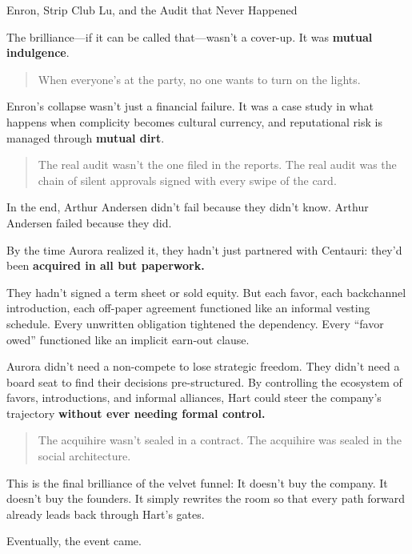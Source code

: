 \begin{HistoricalSidebar}{Enron, Strip Club Lu, and the Audit that Never Happened}
  \medskip
  
  The brilliance—if it can be called that—wasn’t a cover-up. It was \textbf{mutual indulgence}.  
  
  \begin{quote}
  When everyone’s at the party, no one wants to turn on the lights.
  \end{quote}
  
  Enron’s collapse wasn’t just a financial failure. It was a case study in what happens when complicity becomes cultural currency, and reputational risk is managed through \textbf{mutual dirt}.  
  
  \begin{quote}
  The real audit wasn’t the one filed in the reports.  
  The real audit was the chain of silent approvals signed with every swipe of the card.
  \end{quote}
  
  In the end, Arthur Andersen didn’t fail because they didn’t know.  Arthur Andersen failed because they did.
  
\end{HistoricalSidebar}

\medskip

By the time Aurora realized it, they hadn’t just partnered with Centauri: they’d been \textbf{acquired in all but paperwork.}  

They hadn’t signed a term sheet or sold equity. But each favor, each backchannel introduction, each off-paper agreement functioned like an informal vesting schedule. Every unwritten obligation tightened the dependency. Every “favor owed” functioned like an implicit earn-out clause.

Aurora didn’t need a non-compete to lose strategic freedom. They didn’t need a board seat to find their decisions pre-structured. By controlling the ecosystem of favors, introductions, and informal alliances, Hart could steer the company’s trajectory \textbf{without ever needing formal control.}

\begin{quote}
The acquihire wasn’t sealed in a contract.  
The acquihire was sealed in the social architecture.
\end{quote}

This is the final brilliance of the velvet funnel:  
It doesn’t buy the company. It doesn’t buy the founders.  
It simply rewrites the room so that every path forward already leads back through Hart’s gates.

Eventually, the event came.  

